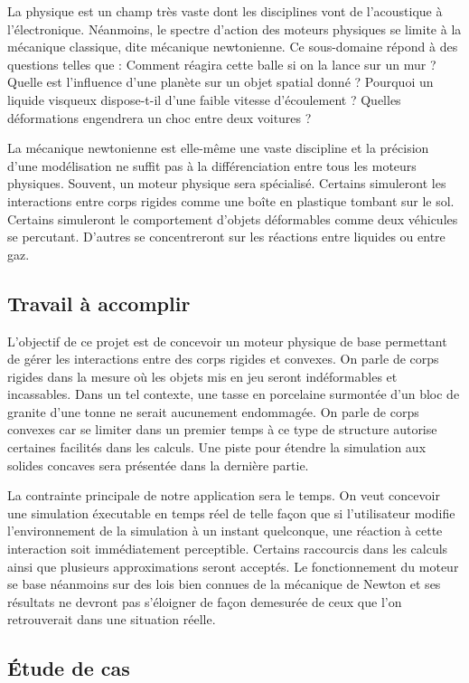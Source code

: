 La physique est un champ très vaste dont les disciplines vont de
l'acoustique à l'électronique. Néanmoins, le spectre d'action des
moteurs physiques se limite à la mécanique classique, dite mécanique
newtonienne. Ce sous-domaine répond à des questions telles que :
Comment réagira cette balle si on la lance sur un mur ? Quelle est
l'influence d'une planète sur un objet spatial donné ? Pourquoi un
liquide visqueux dispose-t-il d'une faible vitesse d'écoulement ?
Quelles déformations engendrera un choc entre deux voitures ?

La mécanique newtonienne est elle-même une vaste discipline et la
précision d'une modélisation ne suffit pas à la différenciation entre
tous les moteurs physiques. Souvent, un moteur physique sera
spécialisé. Certains simuleront les interactions entre corps rigides
comme une boîte en plastique tombant sur le sol. Certains simuleront
le comportement d'objets déformables comme deux véhicules se
percutant. D'autres se concentreront sur les réactions entre liquides
ou entre gaz.

\subsection{Travail à accomplir}

L'objectif de ce projet est de concevoir un moteur physique de base
permettant de gérer les interactions entre des corps rigides et
convexes. On parle de corps rigides dans la mesure o\`u les objets mis
en jeu seront indéformables et incassables. Dans un tel contexte, une
tasse en porcelaine surmontée d'un bloc de granite d'une tonne ne
serait aucunement endommagée. On parle de corps convexes car se
limiter dans un premier temps à ce type de structure autorise
certaines facilités dans les calculs. Une piste pour étendre la
simulation aux solides concaves sera présentée dans la dernière
partie.

La contrainte principale de notre application sera le temps. On veut
concevoir une simulation éxecutable en temps réel de telle façon que
si l'utilisateur modifie l'environnement de la simulation à un instant
quelconque, une réaction à cette interaction soit immédiatement
perceptible. Certains raccourcis dans les calculs ainsi que plusieurs
approximations seront acceptés. Le fonctionnement du moteur se base
néanmoins sur des lois bien connues de la mécanique de Newton et ses
résultats ne devront pas s'éloigner de façon demesurée de ceux que
l'on retrouverait dans une situation réelle.

\subsection{\'Etude de cas}

